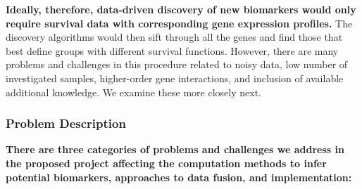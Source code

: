 \documentclass[11pt,a4paper]{article}
\renewcommand{\bold}{\textbf}
\begin{document}
\bold{Ideally, therefore, data-driven discovery of new biomarkers would only require survival data with corresponding gene expression profiles.} The discovery algorithms would then sift through all the genes and find those that best define groups with different survival functions. However, there are many problems and challenges in this procedure related to noisy data, low number of investigated samples, higher-order gene interactions, and inclusion of available additional knowledge. We examine these more closely next.

\subsubsection*{Problem Description}

\bold{There are three categories of problems and challenges we address in the proposed project affecting the computation methods to infer potential biomarkers, approaches to data fusion, and implementation:}
\end{document}
